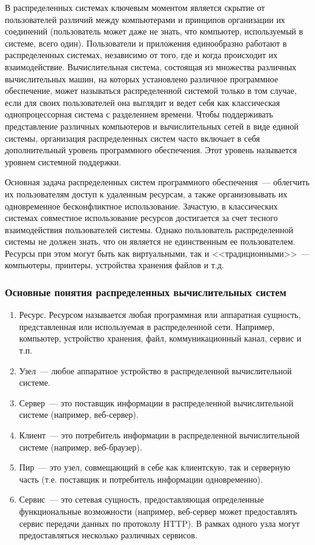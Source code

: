 В распределенных системах ключевым моментом является скрытие от пользователей различий между компьютерами и принципов организации их соединений (пользователь может даже не знать, что компьютер, используемый в системе, всего один). Пользователи и приложения единообразно работают в распределенных системах, независимо от того, где и когда происходит их взаимодействие. Вычислительная система, состоящая из множества различных вычислительных машин, на которых установлено различное программное обеспечение, может называться распределенной системой только в том случае, если для своих пользователей она выглядит и ведет себя как классическая однопроцессорная система с разделением времени. Чтобы поддерживать представление различных компьютеров и вычислительных сетей в виде единой системы, организация распределенных систем часто включает в себя дополнительный уровень программного обеспечения. Этот уровень называется уровнем системной поддержки.

Основная задача распределенных систем программного обеспечения~--- облегчить их пользователям доступ к удаленным ресурсам, а также организовывать их одновременное бесконфликтное использование. Зачастую, в классических системах совместное использование ресурсов достигается за счет тесного взаимодействия пользователей системы. Однако пользователь распределенной системы не должен знать, что он является не единственным ее пользователем. Ресурсы при этом могут быть как виртуальными, так и <<традиционными>>~--- компьютеры, принтеры, устройства хранения файлов и т.д.

\subsubsection{Основные понятия распределенных вычислительных систем}
\begin{enumerate}
\item Ресурс. Ресурсом называется любая программная или аппаратная сущность, представленная или используемая в распределенной сети. Например, компьютер, устройство хранения, файл, коммуникационный канал, сервис и т.п.
\item Узел~--- любое аппаратное устройство в распределенной вычислительной системе.
\item Сервер~--- это поставщик информации в распределенной вычислительной системе (например, веб-сервер).
\item Клиент~--- это потребитель информации в распределенной вычислительной системе (например, веб-браузер).
\item Пир~--- это узел, совмещающий в себе как клиентскую, так и серверную часть (т.е. поставщик и потребитель информации одновременно).
\item Сервис~--- это сетевая сущность, предоставляющая определенные функциональные возможности (например, веб-сервер может предоставлять сервис передачи данных по протоколу HTTP). В рамках одного узла могут предоставляться несколько различных сервисов.
\end{enumerate}

